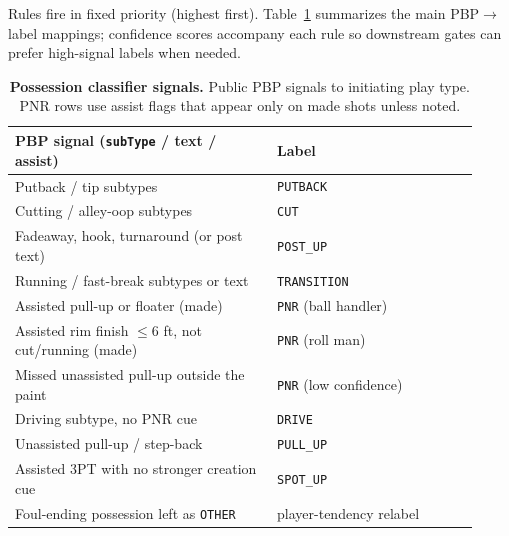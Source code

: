 \documentclass[11pt]{article}
\begin{document}
Rules fire in fixed priority (highest first). Table~\ref{tab:inferrer-signals} summarizes the
main PBP$\to$label mappings; confidence scores accompany each rule so downstream gates can
prefer high-signal labels when needed.
\begin{table}[h]
\centering
\caption{\textbf{Possession classifier signals.} Public PBP signals to initiating play type.
PNR rows use assist flags that appear only on made shots unless noted.}
\label{tab:inferrer-signals}
\small
\begin{tabular}{@{}p{0.52\linewidth}p{0.40\linewidth}@{}}
\toprule
PBP signal (\texttt{subType} / text / assist) & Label \\
\midrule
Putback / tip subtypes & \texttt{PUTBACK} \\
Cutting / alley-oop subtypes & \texttt{CUT} \\
Fadeaway, hook, turnaround (or post text) & \texttt{POST\_UP} \\
Running / fast-break subtypes or text & \texttt{TRANSITION} \\
Assisted pull-up or floater (made) & \texttt{PNR} (ball handler) \\
Assisted rim finish $\le 6$ ft, not cut/running (made) & \texttt{PNR} (roll man) \\
Missed unassisted pull-up outside the paint & \texttt{PNR} (low confidence) \\
Driving subtype, no PNR cue & \texttt{DRIVE} \\
Unassisted pull-up / step-back & \texttt{PULL\_UP} \\
Assisted 3PT with no stronger creation cue & \texttt{SPOT\_UP} \\
Foul-ending possession left as \texttt{OTHER} & player-tendency relabel \\
\bottomrule
\end{tabular}
\end{table}
\end{document}
